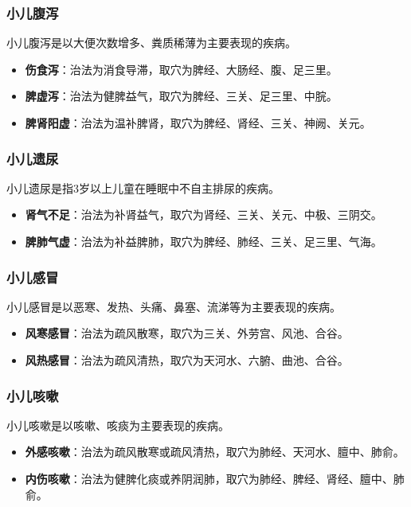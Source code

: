 \documentclass[12pt,UTF8]{ctexbook}
\begin{document}
\subsubsection{小儿腹泻}

小儿腹泻是以大便次数增多、粪质稀薄为主要表现的疾病。

\begin{itemize}
\item \textbf{伤食泻}：治法为消食导滞，取穴为脾经、大肠经、腹、足三里。
\item \textbf{脾虚泻}：治法为健脾益气，取穴为脾经、三关、足三里、中脘。
\item \textbf{脾肾阳虚}：治法为温补脾肾，取穴为脾经、肾经、三关、神阙、关元。
\end{itemize}

\subsubsection{小儿遗尿}

小儿遗尿是指3岁以上儿童在睡眠中不自主排尿的疾病。

\begin{itemize}
\item \textbf{肾气不足}：治法为补肾益气，取穴为肾经、三关、关元、中极、三阴交。
\item \textbf{脾肺气虚}：治法为补益脾肺，取穴为脾经、肺经、三关、足三里、气海。
\end{itemize}

\subsubsection{小儿感冒}

小儿感冒是以恶寒、发热、头痛、鼻塞、流涕等为主要表现的疾病。

\begin{itemize}
\item \textbf{风寒感冒}：治法为疏风散寒，取穴为三关、外劳宫、风池、合谷。
\item \textbf{风热感冒}：治法为疏风清热，取穴为天河水、六腑、曲池、合谷。
\end{itemize}

\subsubsection{小儿咳嗽}

小儿咳嗽是以咳嗽、咳痰为主要表现的疾病。

\begin{itemize}
\item \textbf{外感咳嗽}：治法为疏风散寒或疏风清热，取穴为肺经、天河水、膻中、肺俞。
\item \textbf{内伤咳嗽}：治法为健脾化痰或养阴润肺，取穴为肺经、脾经、肾经、膻中、肺俞。
\end{itemize}
\end{document}
